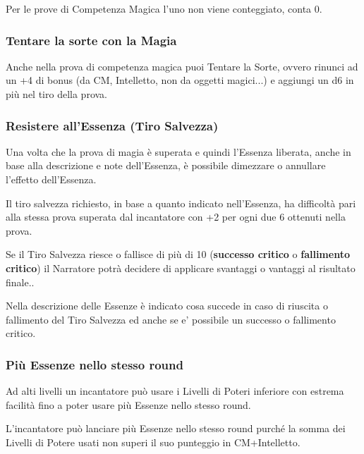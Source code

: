 \documentclass[a4paper,10 pt,twoside,openany]{book}
\begin{document}
Per le prove di Competenza Magica l'uno non viene conteggiato, conta 0.

\subsubsection{Tentare la sorte con la Magia}

\label{tentare-la-sorte-con-la-magia}

Anche nella prova di competenza magica puoi Tentare la Sorte, ovvero rinunci ad un +4 di bonus (da CM, Intelletto, non da oggetti magici...) e aggiungi un d6 in più nel tiro della prova.

\subsubsection{Resistere all'Essenza (Tiro Salvezza)}

\label{resistere-allessenza-tiro-salvezza}

Una volta che la prova di magia è superata e quindi l'Essenza liberata, anche in base alla descrizione e note dell'Essenza, è possibile dimezzare o annullare l'effetto dell'Essenza.

Il tiro salvezza richiesto, in base a quanto indicato nell'Essenza, ha difficoltà pari alla stessa prova superata dal incantatore con +2 per ogni due 6 ottenuti nella prova.

Se il Tiro Salvezza riesce o fallisce di più di 10 (\textbf{successo critico} o \textbf{fallimento critico}) il Narratore potrà decidere di applicare svantaggi o vantaggi al risultato finale..

Nella descrizione delle Essenze è indicato cosa succede in caso di riuscita o fallimento del Tiro Salvezza ed anche se e' possibile un successo o fallimento critico.

\subsubsection{Più Essenze nello stesso round}

Ad alti livelli un incantatore può usare i Livelli di Poteri inferiore con estrema facilità fino a poter usare più Essenze nello stesso round.

L'incantatore può lanciare più Essenze nello stesso round purché la somma dei Livelli di Potere usati non superi il suo punteggio in CM+Intelletto.
\end{document}
